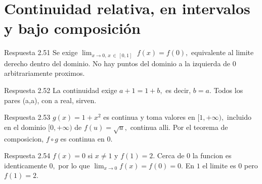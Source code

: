 \documentclass[10pt,a4paper,oneside,openany]{book}
\begin{document}
\section{Continuidad relativa, en intervalos y bajo composición}
\begin{PSevenAnswerFixed}{Respuesta 2.51}
Se exige \(\lim_{x\to 0,\,x\,\in \,[0,1]}\) \(f(x)=f(0),\) equivalente al limite derecho dentro del dominio. No hay puntos del dominio a la izquierda de \(0\) arbitrariamente proximos.
\end{PSevenAnswerFixed}
\begin{PSevenAnswerFixed}{Respuesta 2.52}
La continuidad exige \(a+1=1+b,\) es decir, \(b=a\). Todos los pares (a,a), con a real, sirven.
\end{PSevenAnswerFixed}
\begin{PSevenAnswerFixed}{Respuesta 2.53}
\(g(x)=1+x^{2}\) es continua y toma valores en \([1,+\infty ),\) incluido en el dominio \([0,+\infty )\) de \(f(u)=\sqrt{u},\) continua alli. Por el teorema de composicion, \(f\circ g\) es continua en \(0\).
\end{PSevenAnswerFixed}
\begin{PSevenAnswerFixed}{Respuesta 2.54}
\(f(x)=0\) si \(x\ne 1\) y \(f(1)=2\). Cerca de \(0\) la funcion es identicamente \(0,\) por lo que \(\lim_{x\to 0}f(x)=f(0)=0\). En \(1\) el limite es \(0\) pero \(f(1)=2\).
\end{PSevenAnswerFixed}
\end{document}
